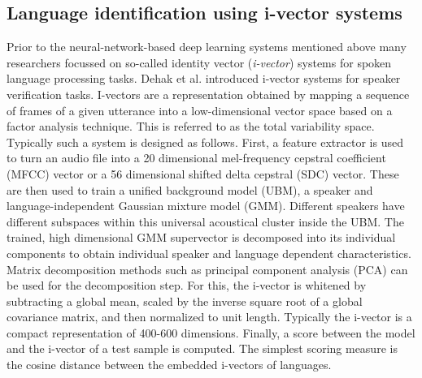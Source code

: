 \subsection{Language identification using i-vector systems}
Prior to the neural-network-based deep learning systems mentioned above many researchers focussed on so-called identity vector (\emph{i-vector}) systems for spoken language processing tasks. Dehak et al. introduced i-vector systems for speaker verification tasks.\cite{dehak2011front} I-vectors are a representation obtained by mapping a sequence of frames of a given utterance into a low-dimensional vector space based on a factor analysis technique. This is referred to as the total variability space.  Typically such a system is designed as follows. First, a feature extractor is used to turn an audio file into a 20 dimensional mel-frequency cepstral coefficient (MFCC) vector or a 56 dimensional shifted delta cepstral (SDC) vector. These are then used to train a unified background model (UBM), a speaker and language-independent Gaussian mixture model (GMM). Different speakers have different subspaces within this universal acoustical cluster inside the UBM. The trained, high dimensional GMM supervector is decomposed into its individual components to obtain individual speaker and language dependent characteristics. Matrix decomposition methods such as principal component analysis (PCA) can be used for the decomposition step. For this, the i-vector is whitened by subtracting a global mean, scaled by the inverse square root of a global covariance matrix, and then normalized to unit length.\cite{garcia2011analysis} Typically the i-vector is a compact representation of 400-600 dimensions. Finally, a score between the model and the i-vector of a test sample is computed. The simplest scoring measure is the cosine distance between the embedded i-vectors of languages.

